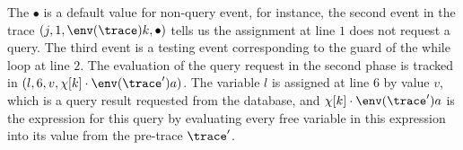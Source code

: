 The $\bullet$ is a default value for non-query event, 
for instance, the second event in the trace $(j, 1, \env(\trace)k , \bullet) $ tells us the assignment at line $1$ does not request a query.
The third event is a testing event corresponding to the guard of the while loop at line $2$. The evaluation of the query request in the second phase is tracked in 
$(l, 6, v, \chi[k] \cdot \env(\trace')a)$. 
The variable $l$ is assigned at line $6$ by value $v$, which is a query result requested from the database,
and $\chi[k] \cdot \env(\trace')a$ is the expression for this query by evaluating 
every free variable in this expression into its value from the pre-trace $\trace'$.


